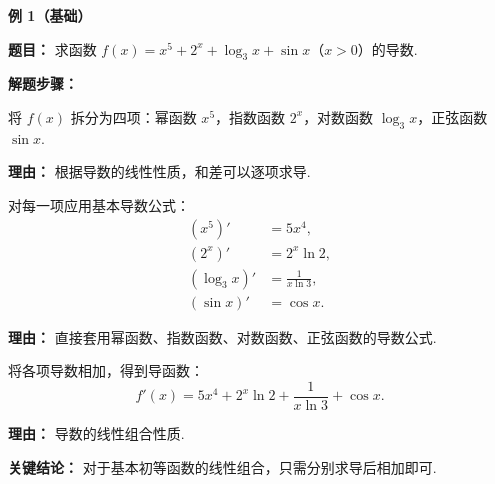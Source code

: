 \begin{examplebox}
\begin{minipage}{\linewidth}
\textbf{\textcolor{CExample}{例 1（基础）}}

	\textbf{\textcolor{CExample}{题目：}}
	求函数 $f(x) = x^5 + 2^x + \log_3 x + \sin x$（$x>0$）的导数.


\end{minipage}

	\textbf{\textcolor{CExample}{解题步骤：}}
	\begin{description}[style=nextline, leftmargin=2.8em, labelsep=0.5em, itemsep=0.45em]
		\item[\textbf{第一步（识别类型）：}] 将 $f(x)$ 拆分为四项：幂函数 $x^5$，指数函数 $2^x$，对数函数 $\log_3 x$，正弦函数 $\sin x$.
			\par\textbf{理由：} 根据导数的线性性质，和差可以逐项求导.

		\item[\textbf{第二步（逐项求导）：}] 对每一项应用基本导数公式：
			\[
				\begin{aligned}
					(x^5)' &= 5x^{4}, \\
					(2^x)' &= 2^x \ln 2, \\
					(\log_3 x)' &= \frac{1}{x\ln 3}, \\
					(\sin x)' &= \cos x.
			\end{aligned}
			\]
			\par\textbf{理由：} 直接套用幂函数、指数函数、对数函数、正弦函数的导数公式.

		\item[\textbf{第三步（组合结果）：}] 将各项导数相加，得到导函数：
			\[
				f'(x) = 5x^4 + 2^x \ln 2 + \frac{1}{x\ln 3} + \cos x.
			\]
			\par\textbf{理由：} 导数的线性组合性质.
	\end{description}

	\textbf{\textcolor{CExample}{关键结论：}}
	对于基本初等函数的线性组合，只需分别求导后相加即可.

	\medskip
\end{examplebox}

